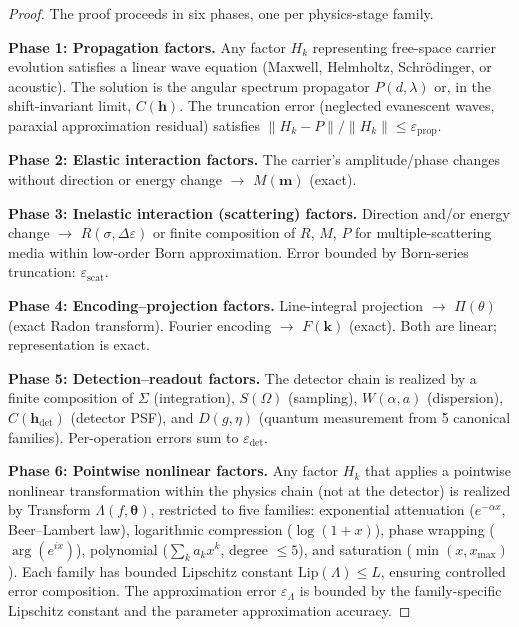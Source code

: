 \documentclass[11pt]{article}
\theoremstyle{definition}
\begin{document}
\begin{proof}
The proof proceeds in six phases, one per physics-stage family.

\medskip
\noindent\textbf{Phase 1: Propagation factors.}
Any factor $H_k$ representing free-space carrier evolution satisfies a linear wave equation (Maxwell, Helmholtz, Schr\"{o}dinger, or acoustic). The solution is the angular spectrum propagator $P(d, \lambda)$ or, in the shift-invariant limit, $C(\mathbf{h})$. The truncation error (neglected evanescent waves, paraxial approximation residual) satisfies $\|H_k - P\|/\|H_k\| \leq \varepsilon_{\mathrm{prop}}$.

\medskip
\noindent\textbf{Phase 2: Elastic interaction factors.}
The carrier's amplitude/phase changes without direction or energy change $\to$ $M(\mathbf{m})$ (exact).

\medskip
\noindent\textbf{Phase 3: Inelastic interaction (scattering) factors.}
Direction and/or energy change $\to$ $R(\sigma, \Delta\varepsilon)$ or finite composition of $R$, $M$, $P$ for multiple-scattering media within low-order Born approximation. Error bounded by Born-series truncation: $\varepsilon_{\mathrm{scat}}$.

\medskip
\noindent\textbf{Phase 4: Encoding--projection factors.}
Line-integral projection $\to$ $\Pi(\theta)$ (exact Radon transform). Fourier encoding $\to$ $F(\mathbf{k})$ (exact). Both are linear; representation is exact.

\medskip
\noindent\textbf{Phase 5: Detection--readout factors.}
The detector chain is realized by a finite composition of $\Sigma$ (integration), $S(\Omega)$ (sampling), $W(\alpha, a)$ (dispersion), $C(\mathbf{h}_{\mathrm{det}})$ (detector PSF), and $D(g, \eta)$ (quantum measurement from 5 canonical families). Per-operation errors sum to $\varepsilon_{\mathrm{det}}$.

\medskip
\noindent\textbf{Phase 6: Pointwise nonlinear factors.}
Any factor $H_k$ that applies a pointwise nonlinear transformation within the physics chain (not at the detector) is realized by Transform $\Lambda(f, \boldsymbol{\theta})$, restricted to five families: exponential attenuation ($e^{-\alpha x}$, Beer--Lambert law), logarithmic compression ($\log(1 + x)$), phase wrapping ($\arg(e^{ix})$), polynomial ($\sum_k a_k x^k$, degree $\leq 5$), and saturation ($\min(x, x_{\max})$). Each family has bounded Lipschitz constant $\mathrm{Lip}(\Lambda) \leq L$, ensuring controlled error composition. The approximation error $\varepsilon_{\Lambda}$ is bounded by the family-specific Lipschitz constant and the parameter approximation accuracy.


\end{proof}
\end{document}
